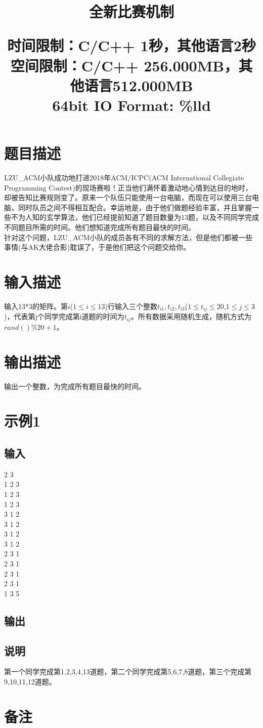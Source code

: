 \documentclass{article}
\date{}
\title{全新比赛机制 \\ [2ex] \begin{large} 
	时间限制：C/C++ 1秒，其他语言2秒 \\
	空间限制：C/C++ 256.000MB，其他语言512.000MB 	\\
	64bit IO Format: \%lld
 			\end{large} }
\begin{document}
		\maketitle \vspace{-50pt}
		
		\section*{题目描述}
		\indent LZU_ACM小队成功地打进2018年ACM/ICPC(ACM International Collegiate Programming Contest)的现场赛啦！正当他们满怀着激动地心情到达目的地时，却被告知比赛规则变了。原来一个队伍只能使用一台电脑，而现在可以使用三台电脑，同时队员之间不得相互配合。幸运地是，由于他们做题经验丰富，并且掌握一些不为人知的玄学算法，他们已经提前知道了题目数量为13题，以及不同同学完成不同题目所需的时间。他们想知道完成所有题目最快的时间。\\
		\indent 针对这个问题，LZU_ACM小队的成员各有不同的求解方法，但是他们都被一些事情(与AK大佬合影)耽误了，于是他们把这个问题交给你。

		\section*{输入描述}
			\noindent 输入13*3的矩阵。第$i$($1 \le i \le 13$)行输入三个整数$t_{i1},t_{i2},t_{i3}$($1 \le t_{ij}\le 20$,$1 \le j \le 3$)，代表第j个同学完成第i道题的时间为$t_{ij}$。所有数据采用随机生成，随机方式为 $rand()\%20+1$。

		\section*{输出描述}
			\noindent 输出一个整数，为完成所有题目最快的时间。
			
		\section*{示例1}
			\subsection*{输入}
 2 3	\\
1 2 3	\\
1 2 3	\\
1 2 3	\\
3 1 2	\\
3 1 2	\\
3 1 2	\\
3 1 2	\\
2 3 1	\\
2 3 1	\\
2 3 1	\\
2 3 1	\\
1 3 5

			\subsection*{输出}

			\subsection*{说明}
			\noindent 第一个同学完成第1,2,3,4,13道题，第二个同学完成第5,6,7,8道题，第三个完成第9,10,11,12道题。
			
		\section*{备注}

	
\end{document}
